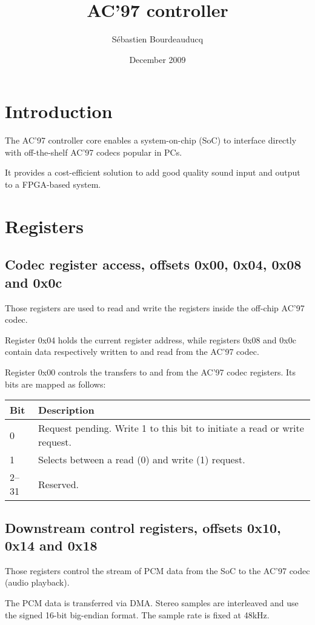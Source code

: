 \documentclass[a4paper,11pt]{article}
\title{AC'97 controller}
\author{S\'ebastien Bourdeauducq}
\date{December 2009}
\begin{document}
\setlength{\parindent}{0pt}
\setlength{\parskip}{5pt}
\maketitle{}
\section{Introduction}
The AC'97 controller core enables a system-on-chip (SoC) to interface directly with off-the-shelf AC'97 codecs popular in PCs.

It provides a cost-efficient solution to add good quality sound input and output to a FPGA-based system.

\section{Registers}
\subsection{Codec register access, offsets 0x00, 0x04, 0x08 and 0x0c}
Those registers are used to read and write the registers inside the off-chip AC'97 codec.

Register 0x04 holds the current register address, while registers 0x08 and 0x0c contain data respectively written to and read from the AC'97 codec.

Register 0x00 controls the transfers to and from the AC'97 codec registers. Its bits are mapped as follows:

\begin{tabularx}{\textwidth}{|l|X|}
\hline
\textbf{Bit} & \textbf{Description} \\
\hline
0 & Request pending. Write 1 to this bit to initiate a read or write request. \\
\hline
1 & Selects between a read (0) and write (1) request. \\
\hline
2--31 & Reserved. \\
\hline
\end{tabularx}

\subsection{Downstream control registers, offsets 0x10, 0x14 and 0x18}
Those registers control the stream of PCM data from the SoC to the AC'97 codec (audio playback).

The PCM data is transferred via DMA. Stereo samples are interleaved and use the signed 16-bit big-endian format. The sample rate is fixed at 48kHz.
\end{document}
